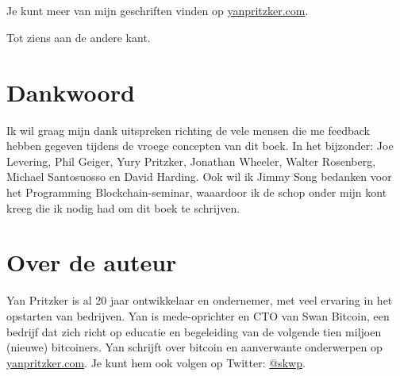 \documentclass[smalldemyvopaper,11pt,twoside,onecolumn,openright,extrafontsizes]{memoir}
\begin{document}
\paragraph{}


Je kunt meer van mijn geschriften vinden op  \href{https://yanpritzker.com}{yanpritzker.com}.

\noindent \hspace{-0.5\baselineskip} Tot ziens aan de andere kant.


\chapter*{Dankwoord}

\vspace{-3\baselineskip}

Ik wil graag mijn dank uitspreken richting de vele mensen die me feedback hebben gegeven tijdens de vroege concepten van dit boek. In het bijzonder: Joe Levering, Phil Geiger, Yury Pritzker, Jonathan Wheeler, Walter Rosenberg, Michael Santosuosso en David Harding. Ook wil ik Jimmy Song bedanken voor het Programming Blockchain-seminar, waaardoor ik de schop onder mijn kont kreeg die ik nodig had om dit boek te schrijven.

\chapter*{Over de auteur}

Yan Pritzker is al 20 jaar ontwikkelaar en ondernemer, met veel ervaring in het opstarten van bedrijven. Yan is mede-oprichter en CTO van Swan Bitcoin, een bedrijf dat zich richt op educatie en begeleiding van de volgende tien miljoen (nieuwe) bitcoiners.
Yan schrijft over bitcoin en aanverwante onderwerpen op \href{https://yanpritzker.com}{yanpritzker.com}. Je kunt hem ook volgen op Twitter: \href{https://twitter.com/skwp}{@skwp}.
\end{document}
